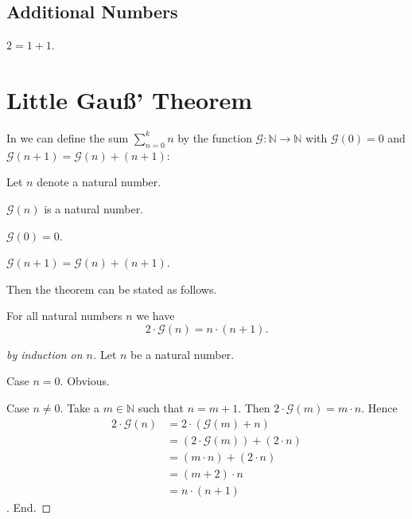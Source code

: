 \documentclass{article}
\newcommand{\gauss}{\mathcal{G}}
\begin{document}
\subsection{Additional Numbers}

\begin{forthel}
  \begin{definition}
    $2 = 1 + 1$.
  \end{definition}
\end{forthel}


\section{Little Gauß' Theorem}

In \Naproche we can define the sum $\sum_{n = 0}^k n$ by the function
$\gauss : \mathbb{N} \to \mathbb{N}$ with $\gauss(0) = 0$ and
$\gauss(n + 1) = \gauss(n) + (n + 1)$:

\begin{forthel}
  Let $n$ denote a natural number.

  \begin{signature*}
    $\gauss(n)$ is a natural number.
  \end{signature*}

  \begin{axiom*}
    $\gauss(0) = 0$.
  \end{axiom*}

  \begin{axiom*}
    $\gauss(n + 1) = \gauss(n) + (n + 1)$.
  \end{axiom*}
\end{forthel}

\noindent Then the theorem can be stated as follows.

\begin{forthel}
  \begin{theorem*}\label{little_gauss}
    For all natural numbers $n$ we have
    \[2 \cdot \gauss(n) = n \cdot (n + 1).\]
  \end{theorem*}
  \begin{proof}[by induction on $n$]
    Let $n$ be a natural number.

    Case $n = 0$. Obvious.

    Case $n \neq 0$.
      Take a $m \in \mathbb{N}$ such that $n = m + 1$.
      Then $2 \cdot \gauss(m) = m \cdot n$.
      Hence
      \begin{align*}
            2 \cdot \gauss(n)
        & = 2 \cdot (\gauss(m) + n)           \\
        & = (2 \cdot \gauss(m)) + (2 \cdot n) \\
        & = (m \cdot n) + (2 \cdot n)         \\
        & = (m + 2) \cdot n                   \\
        & = n \cdot (n + 1)
      \end{align*}.
    End.
  \end{proof}
\end{forthel}

\end{document}
